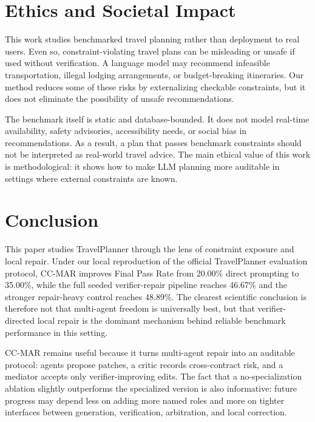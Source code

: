 \documentclass{article}
\begin{document}
\section{Ethics and Societal Impact}
This work studies benchmarked travel planning rather than deployment to real users. Even so, constraint-violating travel plans can be misleading or unsafe if used without verification. A language model may recommend infeasible transportation, illegal lodging arrangements, or budget-breaking itineraries. Our method reduces some of these risks by externalizing checkable constraints, but it does not eliminate the possibility of unsafe recommendations.

The benchmark itself is static and database-bounded. It does not model real-time availability, safety advisories, accessibility needs, or social bias in recommendations. As a result, a plan that passes benchmark constraints should not be interpreted as real-world travel advice. The main ethical value of this work is methodological: it shows how to make LLM planning more auditable in settings where external constraints are known.

\section{Conclusion}
This paper studies TravelPlanner through the lens of constraint exposure and local repair. Under our local reproduction of the official TravelPlanner evaluation protocol, CC-MAR improves Final Pass Rate from 20.00\% direct prompting to 35.00\%, while the full seeded verifier-repair pipeline reaches 46.67\% and the stronger repair-heavy control reaches 48.89\%. The clearest scientific conclusion is therefore not that multi-agent freedom is universally best, but that verifier-directed local repair is the dominant mechanism behind reliable benchmark performance in this setting.

CC-MAR remains useful because it turns multi-agent repair into an auditable protocol: agents propose patches, a critic records cross-contract risk, and a mediator accepts only verifier-improving edits. The fact that a no-specialization ablation slightly outperforms the specialized version is also informative: future progress may depend less on adding more named roles and more on tighter interfaces between generation, verification, arbitration, and local correction.




\appendix
\end{document}
